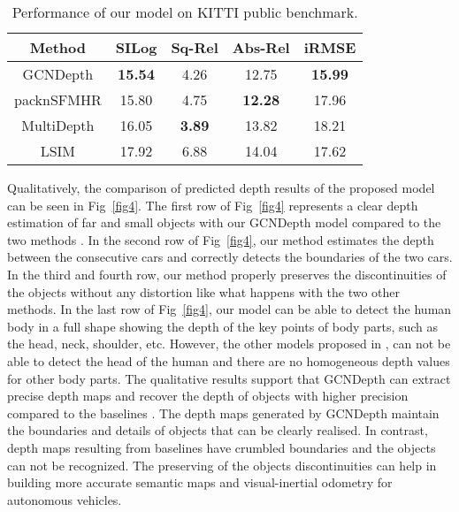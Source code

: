 \documentclass[journal]{IEEEtran}
\begin{document}
\begin{table}[h!]
\centering
\captionsetup{justification=centering}
\caption{\\Performance of our model on KITTI public benchmark.}
\begin{tabular}{|c|c|c|c|c|}
\hline
\textbf{Method} & \textbf{SILog} & \textbf{Sq-Rel} & \textbf{Abs-Rel} & \textbf{iRMSE} \\ \hline\hline
GCNDepth        & \textbf{15.54} & 4.26             & 12.75             & \textbf{15.99} \\ \hline
packnSFMHR\cite{Guizilini}      & 15.80          & 4.75             & \textbf{12.28}    & 17.96          \\ \hline
MultiDepth\cite{Liebel2019}      & 16.05          & \textbf{3.89}    & 13.82             & 18.21          \\ \hline
LSIM\cite{Goldman}            & 17.92          & 6.88             & 14.04             & 17.62          \\ \hline
\end{tabular}
\label{table6}
\end{table}

Qualitatively, the comparison of predicted depth results of the proposed model can be seen in Fig~\ref{fig4}. The first row of Fig~\ref{fig4} represents a clear depth estimation of far and small objects with our GCNDepth model compared to the two methods \cite{Shu2020,Godard2018}. In the second row of Fig~\ref{fig4}, our method estimates the depth between the consecutive cars and correctly detects the boundaries of the two cars. In the third and fourth row, our method properly preserves the discontinuities of the objects without any distortion like what happens with the two other methods. In the last row of Fig~\ref{fig4}, our model can be able to detect the human body in a full shape showing the depth of the key points of body parts, such as the head, neck, shoulder, etc. However, the other models proposed in \cite{Shu2020,Godard2018},  can not be able to detect the head of the human and there are no homogeneous depth values for other body parts. The qualitative results support that GCNDepth can extract precise depth maps and recover the depth of objects with higher precision compared to the baselines  \cite{Shu2020,Godard2018}. The depth maps generated by GCNDepth maintain the boundaries and details of objects that can be clearly realised. In contrast, depth maps resulting from baselines have crumbled boundaries and the objects can not be recognized. The preserving of the objects discontinuities can help in building more accurate semantic maps and visual-inertial odometry for autonomous vehicles.
\end{document}
